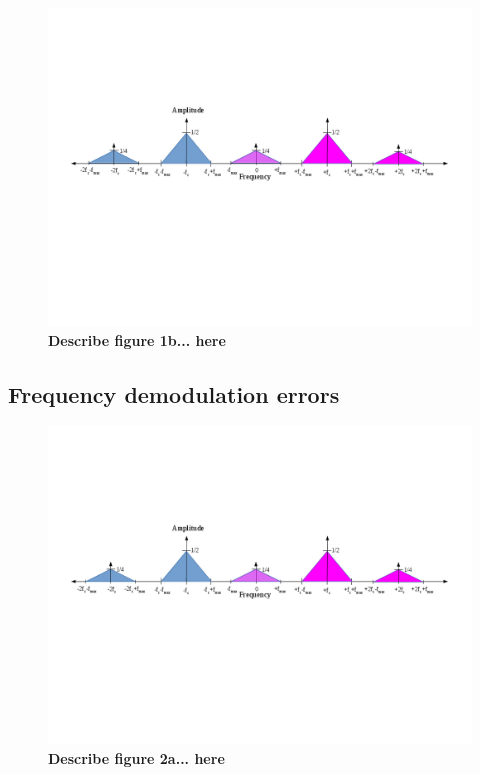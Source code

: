 \documentclass[letterpaper,12pt]{article}
\begin{document}
\begin{figure}[ht] 
\includegraphics[width=1.0\columnwidth]{prelab1-figure1b}
\caption{
\label{fig:hw1-figure1b}
{\bf Describe figure 1b...
here}
}
\end{figure}

\subsection{Frequency demodulation errors}
\begin{figure}[ht] 
\includegraphics[width=1.0\columnwidth]{prelab1-figure2a}
\caption{
\label{fig:hw1-figure2a}
{\bf Describe  figure 2a...
here}
}
\end{figure}
\end{document}
